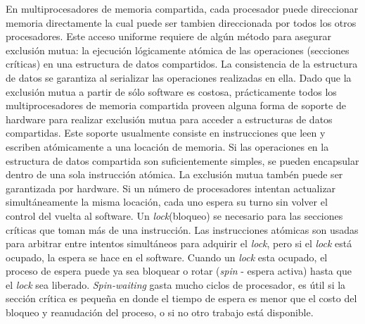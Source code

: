 En multiprocesadores de memoria compartida, cada procesador puede direccionar memoria directamente la cual puede ser tambien direccionada por todos los otros procesadores. Este acceso uniforme requiere de algún método para asegurar exclusión mutua: la ejecución lógicamente atómica de las operaciones (secciones críticas) en una estructura de datos compartidos. La consistencia de la estructura de datos se garantiza al serializar las operaciones realizadas en ella.
Dado que la exclusión mutua a partir de sólo software es costosa, prácticamente todos los multiprocesadores de memoria compartida proveen alguna forma de soporte de hardware para realizar exclusión mutua para acceder a estructuras de datos compartidas. Este soporte usualmente consiste en instrucciones que leen y escriben atómicamente a una locación de memoria. Si las operaciones en la estructura de datos compartida son suficientemente simples, se pueden encapsular dentro de una sola instrucción atómica. La exclusión mutua tambén puede ser garantizada por hardware. Si un número de procesadores intentan actualizar simultáneamente la misma locación, cada uno espera su turno sin volver el control del vuelta al software. Un \textit{lock}(bloqueo) se necesario para las secciones críticas que toman más de una instrucción. Las instrucciones atómicas son usadas para arbitrar entre intentos simultáneos para adquirir el \textit{lock}, pero si el \textit{lock} está ocupado, la espera se hace en el software. Cuando un \textit{lock} esta ocupado, el proceso de espera puede ya sea bloquear o rotar (\textit{spin} - espera activa) hasta que el \textit{lock} sea liberado. \textit{Spin-waiting} gasta mucho ciclos de procesador, es útil si la sección crítica es pequeña en donde el tiempo de espera es menor que el costo del bloqueo y reanudación del proceso, o si no otro trabajo está disponible.

